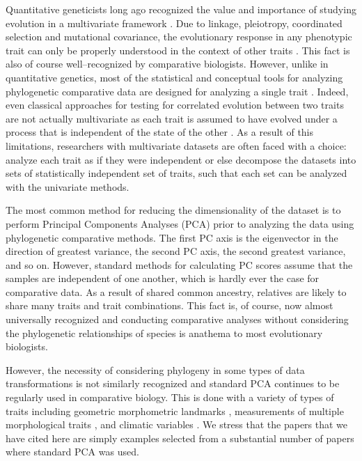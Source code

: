 \documentclass[a4paper,11pt]{article}
\begin{document}
\newpage

\noindent Quantitative geneticists long ago recognized the value and importance of studying evolution in a multivariate framework \citep{Pearson1903}. Due to linkage, pleiotropy, coordinated selection and mutational covariance, the evolutionary response in any phenotypic trait can only be properly understood in the context of other traits \citep{Lande1979, LynchWalsh}. This fact is also of course well--recognized by comparative biologists. However, unlike in quantitative genetics, most of the statistical and conceptual tools for analyzing phylogenetic comparative data \citep[recently reviewed in][]{PennellHarmon} are designed for analyzing a single trait \citep[but see][for some examples of progress towards multivariate comparative methods]{RevellHarmon2008, RevellPCCA, Hohenlohe2008, RevellCollar2009, Schmitz2011, Adams2014}. Indeed, even classical approaches for testing for correlated evolution between two traits \citep[e.g.,][]{Felsenstein1985, Grafen1989, HarveyPagel1991} are not actually multivariate as each trait is assumed to have evolved under a process that is independent of the state of the other \citep{HansenOrzack2005, Hansen2012SysBio}. As a result of this limitations, researchers with multivariate datasets are often faced with a choice: analyze each trait as if they were independent or else decompose the datasets into sets of statistically independent set of traits, such that each set can be analyzed with the univariate methods.

The most common method for reducing the dimensionality of the dataset is to perform Principal Components Analyses (PCA) prior to analyzing the data using phylogenetic comparative methods. The first PC axis is the eigenvector in the direction of greatest variance, the second PC axis, the second greatest variance, and so on. However, standard methods for calculating PC scores assume that the samples are independent of one another, which is hardly ever the case for comparative data. As a result of shared common ancestry, relatives are likely to share many traits and trait combinations. This fact is, of course, now almost universally recognized and conducting comparative analyses without considering the phylogenetic relationships of species is anathema to most evolutionary biologists.

However, the necessity of considering phylogeny in some types of data transformations \citep{Revell2008} is not similarly recognized and standard PCA continues to be regularly used in comparative biology. This is done with a variety of types of traits including geometric morphometric landmarks \citep[e.g.,][]{Dornburg2011, Hunt2013}, measurements of multiple morphological traits \citep[e.g.,][]{Harmon2010, BergmannIrshick2012, Weir2012, Pienaar2013, Price2014}, and climatic variables \citep[e.g.,][]{KozakWiens2010, Schnitzler2012}. We stress that the papers that we have cited here are simply examples selected from a substantial number of papers where standard PCA was used.
\end{document}
